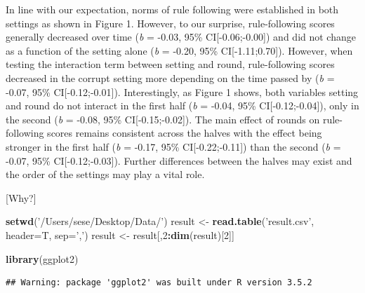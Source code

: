 \documentclass[man]{apa6}
\newenvironment{Shaded}{\begin{snugshade}}{\end{snugshade}}
\newcommand{\DataTypeTok}[1]{\textcolor[rgb]{0.13,0.29,0.53}{#1}}
\newcommand{\DecValTok}[1]{\textcolor[rgb]{0.00,0.00,0.81}{#1}}
\newcommand{\KeywordTok}[1]{\textcolor[rgb]{0.13,0.29,0.53}{\textbf{#1}}}
\newcommand{\NormalTok}[1]{#1}
\newcommand{\OperatorTok}[1]{\textcolor[rgb]{0.81,0.36,0.00}{\textbf{#1}}}
\newcommand{\StringTok}[1]{\textcolor[rgb]{0.31,0.60,0.02}{#1}}
\begin{document}
In line with our expectation, norms of rule following were established
in both settings as shown in Figure 1. However, to our surprise,
rule-following scores generally decreased over time (\emph{b} = -0.03,
95\% CI{[}-0.06;-0.00{]}) and did not change as a function of the
setting alone (\emph{b} = -0.20, 95\% CI{[}-1.11;0.70{]}). However, when
testing the interaction term between setting and round, rule-following
scores decreased in the corrupt setting more depending on the time
passed by (\emph{b} = -0.07, 95\% CI{[}-0.12;-0.01{]}). Interestingly,
as Figure 1 shows, both variables setting and round do not interact in
the first half (\emph{b} = -0.04, 95\% CI{[}-0.12;-0.04{]}), only in the
second (\emph{b} = -0.08, 95\% CI{[}-0.15;-0.02{]}). The main effect of
rounds on rule-following scores remains consistent across the halves
with the effect being stronger in the first half (\emph{b} = -0.17, 95\%
CI{[}-0.22;-0.11{]}) than the second (\emph{b} = -0.07, 95\%
CI{[}-0.12;-0.03{]}). Further differences between the halves may exist
and the order of the settings may play a vital role.

{[}Why?{]}

\begin{Shaded}
\begin{Highlighting}[]
\KeywordTok{setwd}\NormalTok{(}\StringTok{'/Users/sese/Desktop/Data/'}\NormalTok{)}
\NormalTok{result <-}\StringTok{ }\KeywordTok{read.table}\NormalTok{(}\StringTok{'result.csv'}\NormalTok{, }\DataTypeTok{header=}\NormalTok{T, }\DataTypeTok{sep=}\StringTok{','}\NormalTok{)}
\NormalTok{result <-}\StringTok{ }\NormalTok{result[,}\DecValTok{2}\OperatorTok{:}\KeywordTok{dim}\NormalTok{(result)[}\DecValTok{2}\NormalTok{]]}

\KeywordTok{library}\NormalTok{(ggplot2)}
\end{Highlighting}
\end{Shaded}

\begin{verbatim}
## Warning: package 'ggplot2' was built under R version 3.5.2
\end{verbatim}
\end{document}
